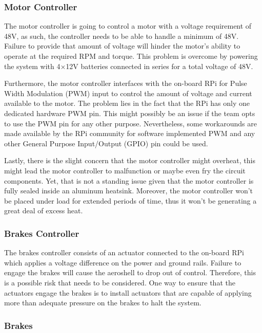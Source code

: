 \subsubsection*{Motor Controller}

\indent\indent The motor controller is going to control a motor with a voltage requirement of 48V, as such, the controller needs to be able to handle a minimum of 48V. Failure to provide that amount of voltage will hinder the motor's ability to operate at the required RPM and torque. This problem is overcome by powering the system with 4$\times$12V batteries connected in series for a total voltage of 48V.

Furthermore, the motor controller interfaces with the on-board RPi for Pulse Width Modulation (PWM) input to control the amount of voltage and current available to the motor. The problem lies in the fact that the RPi has only one dedicated hardware PWM pin. This might possibly be an issue if the team opts to use the PWM pin for any other purpose. Nevertheless, some workarounds are made available by the RPi community for software implemented PWM and any other General Purpose Input/Output (GPIO) pin could be used.

Lastly, there is the slight concern that the motor controller might overheat, this might lead the motor controller to malfunction or maybe even fry the circuit components. Yet, that is not a standing issue given that the motor controller is fully sealed inside an aluminum heatsink. Moreover, the motor controller won't be placed under load for extended periods of time, thus it won't be generating a great deal of excess heat.

\subsubsection*{Brakes Controller}

\indent\indent The brakes controller consists of an actuator connected to the on-board RPi which applies a voltage difference on the power and ground rails. Failure to engage the brakes will cause the aeroshell to drop out of control. Therefore, this is a possible risk that needs to be considered. One way to ensure that the actuators engage the brakes is to install actuators that are capable of applying more than adequate pressure on the brakes to halt the system.


\subsubsection{Brakes}


